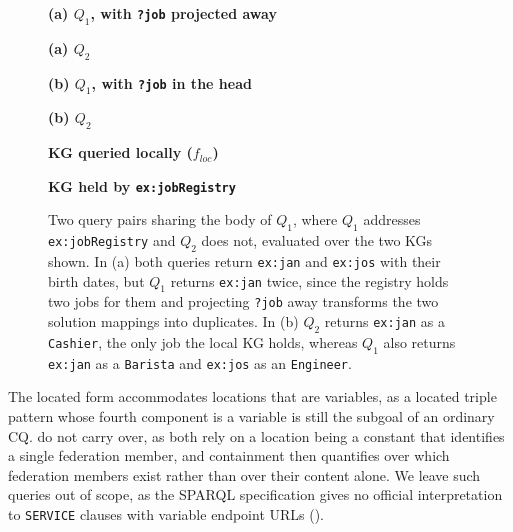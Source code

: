 \documentclass[../main]{subfiles}
\begin{document}
\begin{figure}[!t]
  \begin{minipage}[t]{0.48\linewidth}
    \textbf{(a) $Q_1$, with \texttt{?job} projected away}
    
  \end{minipage}\hfill
  \begin{minipage}[t]{0.48\linewidth}
    \textbf{(a) $Q_2$}
    
  \end{minipage}

  \begin{minipage}[t]{0.48\linewidth}
    \textbf{(b) $Q_1$, with \texttt{?job} in the head}
    
  \end{minipage}\hfill
  \begin{minipage}[t]{0.48\linewidth}
    \textbf{(b) $Q_2$}
    
  \end{minipage}

  \begin{minipage}[t]{0.48\linewidth}
    \textbf{\ac{KG} queried locally ($f_{\mathit{loc}}$)}
    
  \end{minipage}\hfill
  \begin{minipage}[t]{0.48\linewidth}
    \textbf{\ac{KG} held by \texttt{ex:jobRegistry}}
    
  \end{minipage}
  \caption{Two query pairs sharing the body of $Q_1$, where $Q_1$ addresses \texttt{ex:jobRegistry} and $Q_2$ does not, evaluated over the two \acp{KG} shown.
  In (a) both queries return \texttt{ex:jan} and \texttt{ex:jos} with their birth dates, but $Q_1$ returns \texttt{ex:jan} twice, since the registry holds two jobs for them and projecting \texttt{?job} away transforms the two solution mappings into duplicates.
  In (b) $Q_2$ returns \texttt{ex:jan} as a \texttt{Cashier}, the only job the local \ac{KG} holds, whereas $Q_1$ also returns \texttt{ex:jan} as a \texttt{Barista} and \texttt{ex:jos} as an \texttt{Engineer}.}
  \label{fig:extra-member-cases}
\end{figure}

\begin{remark}\label{rem_variable_location}
  The located form accommodates locations that are variables, as a located triple pattern whose fourth component is a variable is still the subgoal of an ordinary \ac{CQ}.
   do not carry over, as both rely on a location being a constant that identifies a single federation member, and containment then quantifies over which federation members exist rather than over their content alone.
  We leave such queries out of scope, as the SPARQL specification gives no official interpretation to \texttt{SERVICE} clauses with variable endpoint URLs ().
\end{remark}
\end{document}
